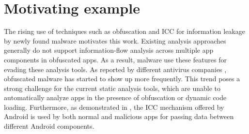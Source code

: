 \section{Motivating example}
\label{sec:prob}



The rising use of techniques such as obfuscation and ICC for information leakage by newly found malware motivates this work. Existing analysis approaches generally do not support information-flow analysis across multiple app components in obfuscated apps. As a result, malware use these features for evading these analysis tools. As reported by different antivirus companies \cite{acecard,adware,adwaregplay,vbmalware,rumms}, obfuscated malware has started to show up more frequently. This trend poses a strong challenge for the current static analysis tools, which are unable to automatically analyze apps in the presence of obfuscation or dynamic code loading. Furthermore, as demonstrated in \cite{li2015iccta}, the ICC mechanism offered by Android is used by both normal and malicious apps for passing data between different Android components. 



\iffalse
\begin{figure}[ht!]
\centering

\caption{MessageReceiver}
\label{fig:mlw1}
\end{figure}
\fi

